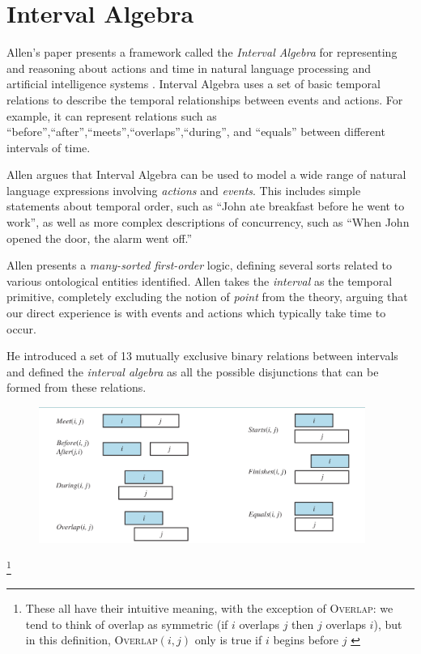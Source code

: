 \section{Interval Algebra}

Allen's paper presents a framework called the \textit{Interval Algebra} for representing and reasoning about actions and time in natural language processing and artificial intelligence systems \cite{allen1984towards}. Interval Algebra uses a set of basic temporal relations to describe the temporal relationships between events and actions. For example, it can represent relations such as ``before'',``after'',``meets'',``overlaps'',``during'', and ``equals'' between different intervals of time.

Allen argues that Interval Algebra can be used to model a wide range of natural language expressions involving \textit{actions} and \textit{events}. This includes simple statements about temporal order, such as ``John ate breakfast before he went to work'', as well as more complex descriptions of concurrency, such as ``When John opened the door, the alarm went off.''

Allen presents a \textit{many-sorted} \textit{first-order} logic, defining several sorts related to various ontological entities identified.
Allen takes the \textit{interval} as the temporal primitive, completely excluding the notion of \textit{point} from the theory, arguing that our direct experience
is with events and actions which typically take time to occur.

He introduced a set of 13 mutually exclusive binary relations between intervals and
defined the \textit{interval algebra} as all the possible disjunctions that can be formed from these relations.

\begin{figure}
  \begin{center}
    \includegraphics[width=0.95\textwidth]{images/allen-13-interval-logic.png}
  \end{center}
  \caption{}
  \label{fig: allen-13-interval-logic}
\end{figure} \footnote{
  These all have their intuitive meaning, with the exception of \textsc{Overlap}: we tend to think of
  overlap as symmetric (if $i$ overlaps $j$ then $j$ overlaps $i$), but in this deﬁnition, \textsc{Overlap}$(i, j)$
  only is true if $i$ begins before $j$ \cite{russell2016artificial}
}


